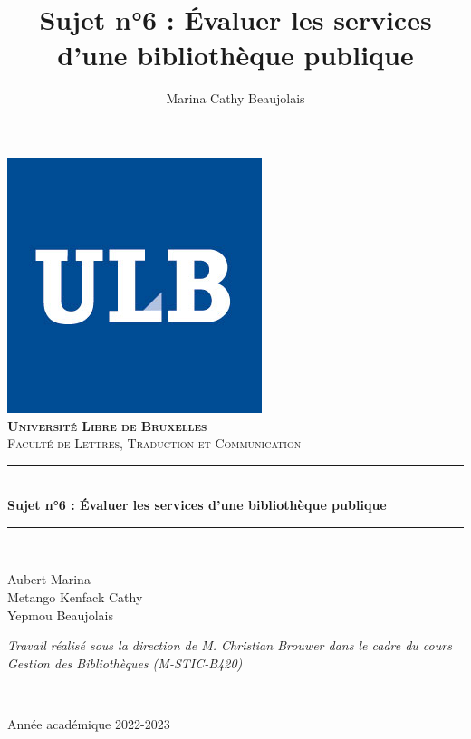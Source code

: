 \documentclass[french,a4paper,12pt]{article}
\title{Sujet n°6 : ​Évaluer les services​ d’une bibliothèque publique} %
\author{Marina Cathy Beaujolais}
\newcommand{\HRule}{\rule{\linewidth}{0.5mm}}
\begin{document}
\begin{titlepage}
  \begin{sffamily}
  \begin{center}
     \includegraphics[scale=0.25]{logoulb.JPG}~\\[1.5cm]

    \textsc{\bfseries \LARGE Université Libre de Bruxelles }\\[0.5cm]
    \textsc{\Large Faculté de Lettres, Traduction et Communication}\\[6cm]

    \HRule \\[0.4cm]
    { \huge \bfseries Sujet n°6 : ​Évaluer les services​ d’une bibliothèque publique\\[0.4cm] }

    \HRule \\[4cm]
    \begin{minipage}{0.4\textwidth}
      \begin{flushleft} \large
        Aubert Marina \\
        Metango Kenfack Cathy \\
        Yepmou Beaujolais \\
        
      \end{flushleft}
    \end{minipage}
    \begin{minipage}{0.4\textwidth}
      \begin{flushright} \large
        \emph{Travail réalisé sous la direction de M. Christian Brouwer dans le cadre du cours Gestion des Bibliothèques (M-STIC-B420)} 
      \end{flushright}
    \end{minipage} \\ [2cm]

    \vfill

    {\large {} Année académique 2022-2023}

  \end{center}
  \end{sffamily}
\end{titlepage}
\end{document}

